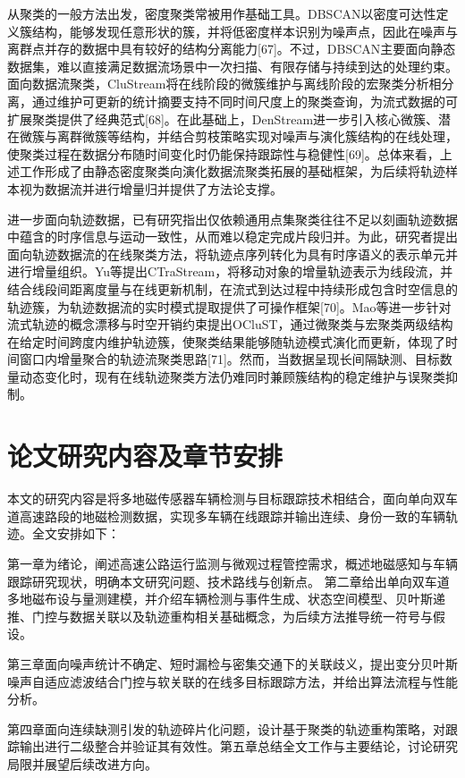 \documentclass{xdupgthesis}
\begin{document}
从聚类的一般方法出发，密度聚类常被用作基础工具。DBSCAN以密度可达性定义簇结构，能够发现任意形状的簇，并将低密度样本识别为噪声点，因此在噪声与离群点并存的数据中具有较好的结构分离能力[67]。不过，DBSCAN主要面向静态数据集，难以直接满足数据流场景中一次扫描、有限存储与持续到达的处理约束。面向数据流聚类，CluStream将在线阶段的微簇维护与离线阶段的宏聚类分析相分离，通过维护可更新的统计摘要支持不同时间尺度上的聚类查询，为流式数据的可扩展聚类提供了经典范式[68]。在此基础上，DenStream进一步引入核心微簇、潜在微簇与离群微簇等结构，并结合剪枝策略实现对噪声与演化簇结构的在线处理，使聚类过程在数据分布随时间变化时仍能保持跟踪性与稳健性[69]。总体来看，上述工作形成了由静态密度聚类向演化数据流聚类拓展的基础框架，为后续将轨迹样本视为数据流并进行增量归并提供了方法论支撑。

进一步面向轨迹数据，已有研究指出仅依赖通用点集聚类往往不足以刻画轨迹数据中蕴含的时序信息与运动一致性，从而难以稳定完成片段归并。为此，研究者提出面向轨迹数据流的在线聚类方法，将轨迹点序列转化为具有时序语义的表示单元并进行增量组织。Yu等提出CTraStream，将移动对象的增量轨迹表示为线段流，并结合线段间距离度量与在线更新机制，在流式到达过程中持续形成包含时空信息的轨迹簇，为轨迹数据流的实时模式提取提供了可操作框架[70]。Mao等进一步针对流式轨迹的概念漂移与时空开销约束提出OCluST，通过微聚类与宏聚类两级结构在给定时间跨度内维护轨迹簇，使聚类结果能够随轨迹模式演化而更新，体现了时间窗口内增量聚合的轨迹流聚类思路[71]。然而，当数据呈现长间隔缺测、目标数量动态变化时，现有在线轨迹聚类方法仍难同时兼顾簇结构的稳定维护与误聚类抑制。



\section{论文研究内容及章节安排}

本文的研究内容是将多地磁传感器车辆检测与目标跟踪技术相结合，面向单向双车道高速路段的地磁检测数据，实现多车辆在线跟踪并输出连续、身份一致的车辆轨迹。全文安排如下：

第一章为绪论，阐述高速公路运行监测与微观过程管控需求，概述地磁感知与车辆跟踪研究现状，明确本文研究问题、技术路线与创新点。
第二章给出单向双车道多地磁布设与量测建模，并介绍车辆检测与事件生成、状态空间模型、贝叶斯递推、门控与数据关联以及轨迹重构相关基础概念，为后续方法推导统一符号与假设。

第三章面向噪声统计不确定、短时漏检与密集交通下的关联歧义，提出变分贝叶斯噪声自适应滤波结合门控与软关联的在线多目标跟踪方法，并给出算法流程与性能分析。

第四章面向连续缺测引发的轨迹碎片化问题，设计基于聚类的轨迹重构策略，对跟踪输出进行二级整合并验证其有效性。第五章总结全文工作与主要结论，讨论研究局限并展望后续改进方向。
\end{document}
